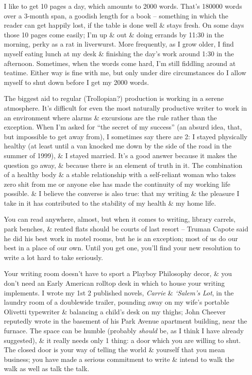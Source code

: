 \documentclass{article}
\numberwithin{equation}{section}
\begin{document}
I like to get 10 pages a day, which amounts to 2000 words. That's 180000 words over a 3-month span, a goodish length for a book -- something in which the reader can get happily lost, if the table is done well \& stays fresh. On some days those 10 pages come easily; I'm up \& out \& doing errands by 11:30 in the morning, perky as a rat in liverwurst. More frequently, as I grow older, I find myself eating lunch at my desk \& finishing the day's work around 1:30 in the afternoon. Sometimes, when the words come hard, I'm still fiddling around at teatime. Either way is fine with me, but only under dire circumstances do I allow myself to shut down before I get my 2000 words.

The biggest aid to regular (Trollopian?) production is working in a serene atmosphere. It's difficult for even the most naturally productive writer to work in an environment where alarms \& excursions are the rule rather than the exception. When I'm asked for ``the secret of my success'' (an absurd idea, that, but impossible to get away from), I sometimes say there are 2: I stayed physically healthy (at least until a van knocked me down by the side of the road in the summer of 1999), \& I stayed married. It's a good answer because it makes the question go away, \& because there is an element of truth in it. The combination of a healthy body \& a stable relationship with a self-reliant woman who takes zero shit from me or anyone else has made the continuity of my working life possible. \& I believe the converse is also true: that my writing \& the pleasure I take in it has contributed to the stability of my health \& my home life.

 You can read anywhere, almost, but when it comes to writing, library carrels, park benches, \& rented flats should be courts of last resort -- Truman Capote said he did his best work in motel rooms, but he is an exception; most of us do our best in a place of our own. Until you get one, you'll find your new resolution to write a lot hard to take seriously.

Your writing room doesn't have to sport a Playboy Philosophy decor, \& you don't need an Early American rolltop desk in which to house your writing implements. I wrote my 1st 2 published novels, \textit{Carrie} \& \textit{`Salem's Lot}, in the laundry room of a doublewide trailer, pounding away on my wife's portable Olivetti typewriter \& balancing a child's desk on my thighs; John Cheever reputedly wrote in the basement of his Park Avenue apartment building, near the furnace. The space can be humble (probably \textit{should} be, as I think I have already suggested), \& it really needs only 1 thing: a door which you are willing to shut. The closed door is your way of telling the world \& yourself that you mean business; you have made a serious commitment to write \& intend to walk the walk as well as talk the talk.
\end{document}
